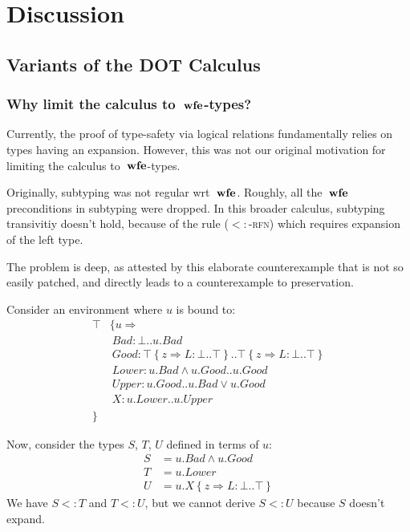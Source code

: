 \documentclass[9pt]{sigplanconf}
\newcommand{\sub}{<:}
\newcommand{\wfe}{\;\mbox{\textbf{wfe}}}
\newcommand{\tand}{\wedge}
\newcommand{\tor}{\vee}
\newcommand{\refine}[2]{\left\{#1 \Rightarrow #2 \right\}}
\newcommand{\mlrefine}[2]{\{#1 \Rightarrow #2 \}}
\newcommand{\Ldecl}[3]{#1 : #2..#3}%
\newcommand{\Top}{\top}%
\newcommand{\Bot}{\bot}%
\begin{document}
\section{Discussion}\label{discussion}

\subsection{Variants of the DOT Calculus}\label{dot-variants}

\subsubsection{Why limit the calculus to $\wfe$-types?}

Currently, the proof of type-safety via logical relations
fundamentally relies on types having an expansion. However, this was
not our original motivation for limiting the calculus to $\wfe$-types.

Originally, subtyping was not regular wrt $\wfe$. Roughly,
all the $\wfe$ preconditions in subtyping were dropped. In this
broader calculus, subtyping transivitiy doesn't hold, because of the
rule (\textsc{$\sub$-rfn}) which requires expansion of the left type.

The problem is deep, as attested by this elaborate counterexample
that is not so easily patched, and directly leads to a counterexample
to preservation.

Consider an environment where $u$ is bound to:
\begin{align*}
\Top & \mlrefine u {\\
&\ \Ldecl {\mathit{Bad}} {\Bot} {u.\mathit{Bad}}\\
&\ \Ldecl {\mathit{Good}} {\Top \refine z {\Ldecl L \Bot \Top}} {\Top \refine z {\Ldecl L \Bot \Top}}\\
&\ \Ldecl {\mathit{Lower}} {u.\mathit{Bad} \tand u.\mathit{Good}} {u.\mathit{Good}}\\
&\ \Ldecl {\mathit{Upper}} {u.\mathit{Good}} {u.\mathit{Bad} \tor u.\mathit{Good}}\\
&\ \Ldecl X {u.\mathit{Lower}} {u.\mathit{Upper}}\\
}&
\end{align*}

Now, consider the types $S$, $T$, $U$ defined in terms of $u$:
\begin{align*}
S &= u.\mathit{Bad} \tand u.\mathit{Good}\\
T &= u.\mathit{Lower}\\
U &= u.X \refine z {\Ldecl L \Bot \Top}
\end{align*}
We have $S \sub T$ and $T \sub U$, but we cannot derive $S \sub U$ because
$S$ doesn't expand.
\end{document}
